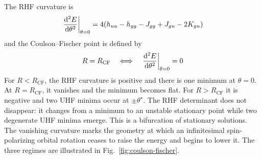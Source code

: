 \documentclass[11pt,a4paper,titlepage]{article}
\numberwithin{equation}{section}
\begin{document}
The RHF curvature is
\begin{equation}
  \eval{\dv[2]{E}{\theta}}_{\theta=0}
  =4\qty(h_{uu}-h_{gg}-J_{gg}+J_{gu}-2K_{gu})
\end{equation}
and the Coulson--Fischer point \citep{CoulsonFischer1949} is defined by
\begin{equation}
    R=R_\text{CF}
    \quad\Longleftrightarrow\quad
    \eval{\dv[2]{E}{\theta}}_{\theta=0}=0
\end{equation}
For $R<R_\text{CF}$, the RHF curvature is positive and there is one minimum
at $\theta=0$. At $R=R_\text{CF}$, it vanishes and the minimum becomes flat.
For $R>R_\text{CF}$ it is negative and two UHF minima occur at
$\pm\theta^\star$. The RHF determinant does not disappear: it changes from a
minimum to an unstable stationary point while two degenerate UHF minima
emerge.
This is a bifurcation of stationary solutions. The vanishing curvature marks
the geometry at which an infinitesimal spin-polarizing orbital rotation ceases
to raise the energy and begins to lower it.
The three regimes are illustrated in Fig.~\ref{fig:coulson-fischer}.
\end{document}
